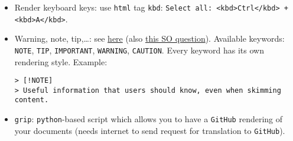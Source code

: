 \documentclass[a4paper,12pt,%
              final%
              ]{article}
\begin{document}
\begin{itemize}
\begin{itemize}
\begin{itemize}
          \item Display: double dollar, e.g., \verb|$$ \alpha $$| or code-block
\begin{verbatim}
```math
\alpha
```
\end{verbatim}
        \end{itemize}
      \item \texttt{GitHub}
        \begin{itemize}
          \item \href{https://docs.github.com/en/get-started/writing-on-github/working-with-advanced-formatting/writing-mathematical-expressions}{Official docs}
          \item Inline: dollar, e.g., \verb|$\alpha$|
          \item Display: double dollar, e.g., \verb|$$ \alpha $$| or code-block
\begin{verbatim}
```math
\alpha
```
\end{verbatim}
          \item {[Deprecated workaround]} However, there seems to be some workarounds, see \href{https://stackoverflow.com/questions/11256433/how-to-show-math-equations-in-general-githubs-markdownnot-githubs-blog}{here} (linking to third-party render) or \href{https://gist.github.com/cyhsutw/d5983d166fb70ff651f027b2aa56ee4e}{here} (write \LaTeX{} code inside a \texttt{jupyter} notebook, for tips about \LaTeX{} and \texttt{jupyter} see \texttt{python} section, \ref{sec:python}, and/or \href{https://jupyterbook.org/content/math.html}{here})
        \end{itemize}
    \end{itemize}
  \item Render keyboard keys: use \texttt{html} tag \texttt{kbd}: \verb|Select all: <kbd>Ctrl</kbd> + <kbd>A</kbd>|.
  \item Warning, note, tip,\dots: see \href{https://docs.github.com/en/get-started/writing-on-github/getting-started-with-writing-and-formatting-on-github/basic-writing-and-formatting-syntax#alerts}{here} (also \href{https://stackoverflow.com/questions/50544499/how-to-make-a-styled-markdown-admonition-box-in-a-github-gist}{this SO question}). Available keywords: \texttt{NOTE}, \texttt{TIP}, \texttt{IMPORTANT}, \texttt{WARNING}, \texttt{CAUTION}. Every keyword has its own rendering style. Example:
\begin{verbatim}
> [!NOTE]
> Useful information that users should know, even when skimming content.
\end{verbatim}
  \item \texttt{grip}: \texttt{python}-based script which allows you to have a \texttt{GitHub} rendering of your documents (needs internet to send request for translation to \texttt{GitHub}).

\end{itemize}
\end{document}
